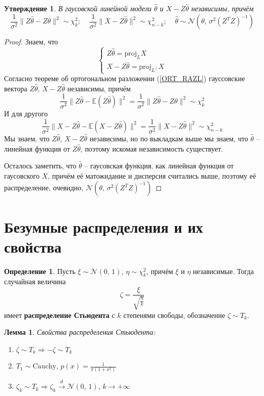 \documentclass[a4paper,12pt]{article}
\theoremstyle{plain}
\newtheorem{lemma}{Лемма}[section]
\newtheorem{proposition}{Утверждение}[section]
\theoremstyle{definition}
\newtheorem{definition}{Определение}[section]
\theoremstyle{remark}
\begin{document}
\begin{proposition}
  В гаусовской линейной модели $\hat{\theta}$ и $X - Z\hat{\theta}$ независимы, причём
  \[
    \frac{1}{\sigma^2}\|Z\hat{\theta} - Z\theta\|^2 \sim \chi^2_k;\;\;\;\; \frac{1}{\sigma^2}\|X - Z\hat{\theta}\|^2 \sim \chi^2_{n - k};\;\;\;\; \hat{\theta} \sim \mathcal{N}(\theta,\, \sigma^2(Z^TZ)^{-1})
  \]
\end{proposition}

\begin{proof}
  Знаем, что
  \[
    \begin{cases}
      Z\hat{\theta} = \text{proj}_LX\\
      X - Z\hat{\theta} = \text{proj}_{L^\bot}X
    \end{cases}
  \]
  Согласно теореме об ортогональном разложении (\ref{ORT_RAZL}) гауссовские вектора $Z\hat{\theta},\, X - Z\hat{\theta}$ независимы, причём
  \[
    \frac{1}{\sigma^2}\|Z\hat{\theta} - \mathbb{E}(Z\hat{\theta})\|^2 = \frac{1}{\sigma^2}\|Z\hat{\theta} - Z\theta\|^2 \sim \chi^2_k
  \]
  И для другого
  \[
    \frac{1}{\sigma^2}\|X - Z\hat{\theta} - \mathbb{E}(X - Z\hat{\theta})\|^2 = \frac{1}{\sigma^2}\|X - Z\hat{\theta}\|^2 \sim \chi^2_{n - k}
  \]
  Мы знаем, что $Z\hat{\theta},\, X - Z\hat{\theta}$ независимы, но по выкладкам выше мы знаем, что $\hat{\theta}$ -- линейная функция от $Z\hat{\theta}$, поэтому искомая независимость существует.

  Осталось заметить, что $\hat{\theta}$ -- гаусовская функция, как линейная функция от гаусовского $X$, причём её матожидание и дисперсия считались выше, поэтому её распределение, очевидно, $\mathcal{N}(\theta,\, \sigma^2(Z^TZ)^{-1})$
\end{proof}

\section{Безумные распределения и их свойства}
\begin{definition}
  Пусть $\xi \sim \mathcal{N}(0,\,1),\, \eta \sim \chi^2_k$, причём $\xi$ и $\eta$ независимые. Тогда случайная величина
  \[
    \zeta = \frac{\xi}{\sqrt{\frac{\eta}{k}}}
  \]
  имеет \textbf{распределение Стьюдента} с $k$ степенями свободы, обозначение $\zeta \sim T_k$.
\end{definition}

\begin{lemma}
  Свойства распределения Стьюдента:
  \begin{enumerate}
    \item $\zeta \sim T_k \Rightarrow -\zeta \sim T_k$
    \item $T_1 \sim \text{Cauchy},\, p(x) = \frac{1}{\pi(1 + x^2)}$
    \item $\zeta_k \sim T_k \Rightarrow \zeta_k \overset{d}{\to} \mathcal{N}(0,\,1),\, k \to +\infty$
  \end{enumerate}
\end{lemma}
\end{document}
